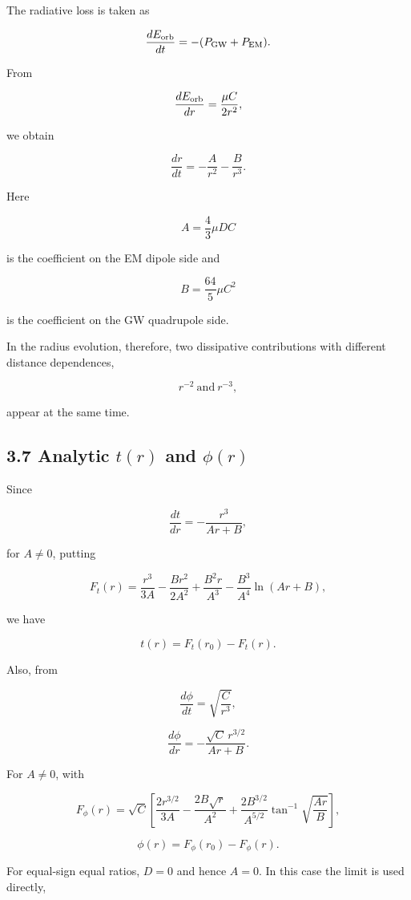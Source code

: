 \documentclass[
  a4paper,
]{article}
\begin{document}
The radiative loss is taken as

\[
\frac{dE_{\rm orb}}{dt}
=-(P_{\rm GW}+P_{\rm EM}).
\]

From

\[
\frac{dE_{\rm orb}}{dr}
=
\frac{\mu C}{2r^2},
\]

we obtain

\[
\boxed{
\frac{dr}{dt}
=-\frac{A}{r^2}-\frac{B}{r^3}.
}
\]

Here

\[
\boxed{
A=\frac43\mu D C
}
\]

is the coefficient on the EM dipole side and

\[
\boxed{
B=\frac{64}{5}\mu C^2
}
\]

is the coefficient on the GW quadrupole side.

In the radius evolution, therefore, two dissipative contributions with
different distance dependences,

\[
\boxed{
r^{-2}\ \text{and}\ r^{-3},
}
\]

appear at the same time.

\subsection{\texorpdfstring{3.7 Analytic \(t(r)\) and
\(\phi(r)\)}{3.7 Analytic t(r) and \textbackslash phi(r)}}\label{analytic-tr-and-phir}

Since

\[
\frac{dt}{dr}
=-\frac{r^3}{Ar+B},
\]

for \(A\ne0\), putting

\[
F_t(r)
=
\frac{r^3}{3A}
-\frac{Br^2}{2A^2}
+\frac{B^2r}{A^3}
-\frac{B^3}{A^4}\ln(Ar+B),
\]

we have

\[
\boxed{
t(r)=F_t(r_0)-F_t(r)}.
\]

Also, from

\[
\frac{d\phi}{dt}=\sqrt{\frac{C}{r^3}},
\]

\[
\frac{d\phi}{dr}
=-\frac{\sqrt C\,r^{3/2}}{Ar+B}.
\]

For \(A\ne0\), with

\[
F_\phi(r)
=
\sqrt C
\left[
\frac{2r^{3/2}}{3A}
-\frac{2B\sqrt r}{A^2}
+\frac{2B^{3/2}}{A^{5/2}}
\tan^{-1}\sqrt{\frac{Ar}{B}}
\right],
\]

\[
\boxed{
\phi(r)=F_\phi(r_0)-F_\phi(r)}.
\]

For equal-sign equal ratios, \(D=0\) and hence \(A=0\). In this case the
limit is used directly,
\end{document}
